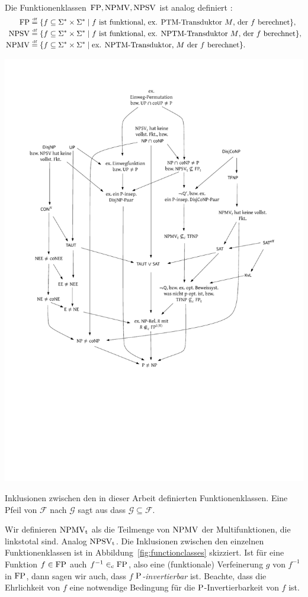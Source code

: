 Die Funktionenklassen $\FP, \mathrm{NPMV}, \mathrm{NPSV}$ ist analog definiert \parencite{selman_taxonomy_1994}:
\bgroup\setlength{\mathindent}{0pt}
\begin{align*}
    \FP &\defeq \{ f\subseteq \Sigma^*\times\Sigma^* \mid \text{$f$ ist funktional, ex. PTM-Transduktor $M$, der $f$ berechnet} \},\\
    \NPSV &\defeq \{ f\subseteq \Sigma^*\times\Sigma^* \mid \text{$f$ ist funktional, ex. NPTM-Transduktor $M$, der $f$ berechnet} \},\\
    \NPMV &\defeq \{ f\subseteq \Sigma^*\times\Sigma^* \mid \text{ex. NPTM-Transduktor, $M$ der $f$ berechnet} \}.
\end{align*}\egroup
\begin{marginfigure}
    \centering\includegraphics[page=9]{figures.pdf}
    \caption{Inklusionen zwischen den in dieser Arbeit definierten Funktionenklassen. Eine Pfeil von $\mathcal F$ nach $\mathcal G$ sagt aus dass $\mathcal{G}\subseteq \mathcal F$.}\label{fig:functionclasses}
\end{marginfigure}
Wir definieren $\NPMVt$ als die Teilmenge von $\NPMV$ der Multifunktionen, die linkstotal sind. Analog $\NPSVt$. Die Inklusionen zwischen den einzelnen Funktionenklassen ist in Abbildung~\ref{fig:functionclasses} skizziert.
Ist für eine Funktion $f\in\FP$ auch $f^{-1}\inc \FP$, also eine (funktionale) Verfeinerung $g$ von $f^{-1}$ in $\FP$, dann sagen wir auch, dass $f$ \emph{$\P$-invertierbar} ist. Beachte, dass die Ehrlichkeit von $f$ eine notwendige Bedingung für die $\P$-Invertierbarkeit von $f$ ist.

